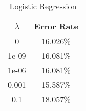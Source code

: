 \begin{center}
\begin{longtable}{|c|c|}
\caption{Logistic Regression}\label{tab:logreg}\\
\hline
$\lambda$ & Error Rate \\
\hline
0 & 16.026\% \\
\hline
1e-09 & 16.081\% \\
\hline
1e-06 & 16.081\% \\
\hline
0.001 & 15.587\% \\
\hline
0.1 & 18.057\% \\
\hline
\hline
\end{longtable}
\end{center}

